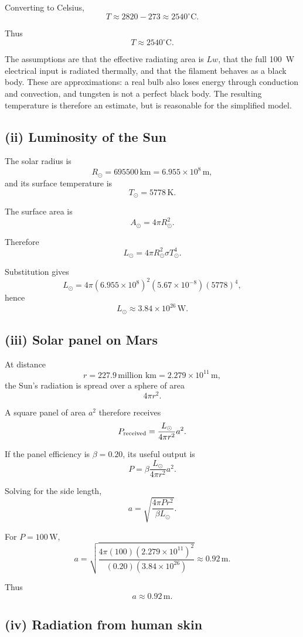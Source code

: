 \documentclass[11pt,a4paper]{article}
\begin{document}
Converting to Celsius,
\[
T\approx2820-273
\approx2540^\circ\mathrm C.
\]

Thus
\[
\boxed{T\approx2540^\circ\mathrm C}.
\]

The assumptions are that the effective radiating area is $Lw$, that the full
\SI{100}{W} electrical input is radiated thermally, and that the filament behaves as
a black body. These are approximations: a real bulb also loses energy through
conduction and convection, and tungsten is not a perfect black body. The resulting
temperature is therefore an estimate, but is reasonable for the simplified model.

\subsection{(ii) Luminosity of the Sun}

The solar radius is
\[
R_\odot=695500\,\mathrm{km}=6.955\times10^8\,\mathrm m,
\]
and its surface temperature is
\[
T_\odot=5778\,\mathrm K.
\]

The surface area is
\[
A_\odot=4\pi R_\odot^2.
\]

Therefore
\[
L_\odot
=
4\pi R_\odot^2\sigma T_\odot^4.
\]

Substitution gives
\[
L_\odot
=
4\pi(6.955\times10^8)^2
(5.67\times10^{-8})(5778)^4,
\]
hence
\[
\boxed{L_\odot\approx3.84\times10^{26}\,\mathrm W}.
\]

\subsection{(iii) Solar panel on Mars}

At distance
\[
r=227.9\,\text{million km}
=2.279\times10^{11}\,\mathrm m,
\]
the Sun's radiation is spread over a sphere of area
\[
4\pi r^2.
\]

A square panel of area $a^2$ therefore receives
\[
P_{\rm received}
=
\frac{L_\odot}{4\pi r^2}a^2.
\]

If the panel efficiency is $\beta=0.20$, its useful output is
\[
P
=
\beta\frac{L_\odot}{4\pi r^2}a^2.
\]

Solving for the side length,
\[
a=
\sqrt{
\frac{4\pi P r^2}{\beta L_\odot}
}.
\]

For $P=100\,\mathrm W$,
\[
a
=
\sqrt{
\frac{4\pi(100)(2.279\times10^{11})^2}
{(0.20)(3.84\times10^{26})}
}
\approx0.92\,\mathrm m.
\]

Thus
\[
\boxed{a\approx0.92\,\mathrm m}.
\]

\subsection{(iv) Radiation from human skin}
\end{document}
